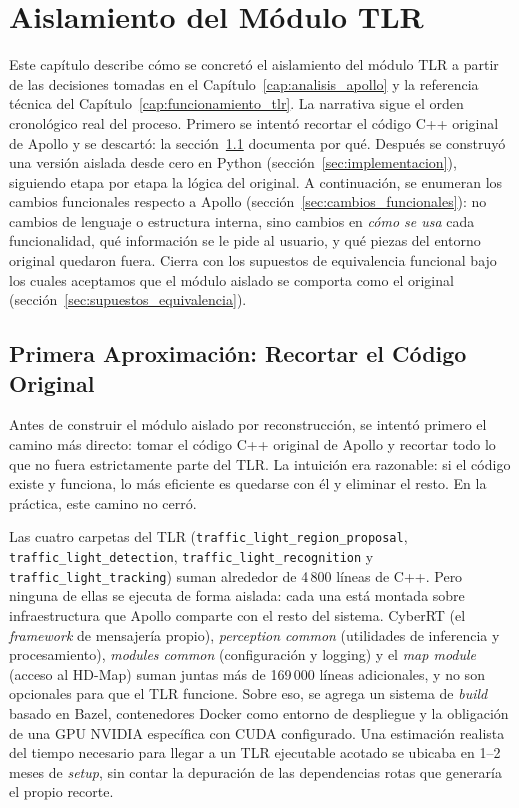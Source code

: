 \chapter{Aislamiento del Módulo TLR}
\label{cap:reimplementacion}

Este capítulo describe cómo se concretó el aislamiento del módulo TLR a partir de las decisiones tomadas en el Capítulo~\ref{cap:analisis_apollo} y la referencia técnica del Capítulo~\ref{cap:funcionamiento_tlr}. La narrativa sigue el orden cronológico real del proceso. Primero se intentó recortar el código C++ original de Apollo y se descartó: la sección~\ref{sec:recorte_fallido} documenta por qué. Después se construyó una versión aislada desde cero en Python (sección~\ref{sec:implementacion}), siguiendo etapa por etapa la lógica del original. A continuación, se enumeran los cambios funcionales respecto a Apollo (sección~\ref{sec:cambios_funcionales}): no cambios de lenguaje o estructura interna, sino cambios en \textit{cómo se usa} cada funcionalidad, qué información se le pide al usuario, y qué piezas del entorno original quedaron fuera. Cierra con los supuestos de equivalencia funcional bajo los cuales aceptamos que el módulo aislado se comporta como el original (sección~\ref{sec:supuestos_equivalencia}).

\section{Primera Aproximación: Recortar el Código Original}
\label{sec:recorte_fallido}

Antes de construir el módulo aislado por reconstrucción, se intentó primero el camino más directo: tomar el código C++ original de Apollo y recortar todo lo que no fuera estrictamente parte del TLR. La intuición era razonable: si el código existe y funciona, lo más eficiente es quedarse con él y eliminar el resto. En la práctica, este camino no cerró.

Las cuatro carpetas del TLR (\texttt{traffic\_light\_region\_proposal}, \texttt{traffic\_light\_detection}, \texttt{traffic\_light\_recognition} y \texttt{traffic\_light\_tracking}) suman alrededor de 4\,800 líneas de C++. Pero ninguna de ellas se ejecuta de forma aislada: cada una está montada sobre infraestructura que Apollo comparte con el resto del sistema. CyberRT (el \textit{framework} de mensajería propio), \textit{perception common} (utilidades de inferencia y procesamiento), \textit{modules common} (configuración y logging) y el \textit{map module} (acceso al HD-Map) suman juntas más de 169\,000 líneas adicionales, y no son opcionales para que el TLR funcione. Sobre eso, se agrega un sistema de \textit{build} basado en Bazel, contenedores Docker como entorno de despliegue y la obligación de una GPU NVIDIA específica con CUDA configurado. Una estimación realista del tiempo necesario para llegar a un TLR ejecutable acotado se ubicaba en 1--2 meses de \textit{setup}, sin contar la depuración de las dependencias rotas que generaría el propio recorte.

